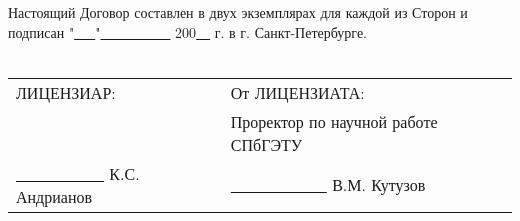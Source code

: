 Настоящий Договор составлен в двух экземплярах для каждой из Сторон и подписан "\underline{\ \ \ }"\underline{\ \ \ \ \ \ \ \ \ \ } 200\underline{\ \ } г. в г. Санкт-Петербурге.
\\
\\

\begin{tabular}{p{20em}p{20em}}
    ЛИЦЕНЗИАР: &   От ЛИЦЕНЗИАТА: \\
     & Проректор по научной работе СПбГЭТУ \\
    \underline{\ \ \ \ \ \ \ \ \ \ \ }  К.С. Андрианов & 	

            \underline{\ \ \ \ \ \ \ \ \ \ \ \ } В.М. Кутузов
            \\
\end{tabular}

